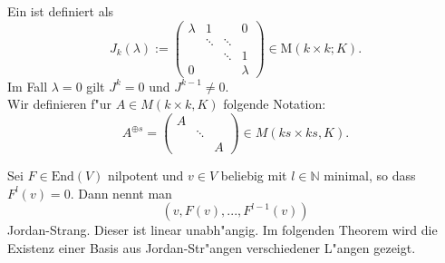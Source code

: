 \documentclass[9pt, a4paper, twocolumn, landscape]{article}
\begin{document}
\begin{definition}
Ein  ist definiert als $$J_{k}(\lambda):=\left(\begin{array}{cccc}
{\lambda} & {1} & {} & {0} 
\\ {} & {\ddots} & {\ddots} & {} 
\\ {} & {} & {\ddots} & {1} 
\\ {0} & {} & {} & {\lambda}\end{array}\right) \in \mathrm{M}(k \times k ; K).$$ Im Fall $\lambda = 0$ gilt  $J^k = 0$ und $J^{k-1} \neq 0$. \\
Wir definieren f"ur $A \in M(k \times k, K)$ folgende Notation:
$$
A^{\oplus s} = \left( \begin{array}{ccc} A & &  \\ & \ddots & \\ & & A \end{array} \right) \in M(ks \times ks, K).
$$
\end{definition}


\begin{definition}
Sei $F \in \mathrm{End}(V)$ nilpotent und $v \in V$ beliebig mit $l \in \mathbb{N}$ minimal, so dass $F^l(v) = 0$. Dann nennt man
$$
(v, F(v), ..., F^{l-1}(v))
$$
Jordan-Strang. Dieser ist linear unabh"angig. Im folgenden Theorem wird die Existenz einer Basis aus Jordan-Str"angen verschiedener L"angen gezeigt.
\end{definition}
\end{document}
